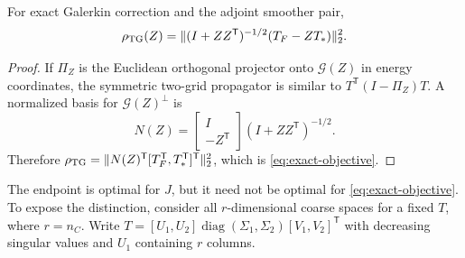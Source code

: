 \documentclass[smallextended]{svjour3}
\newcommand{\T}{\mathsf{T}}
\newcommand{\diag}{\operatorname{diag}}
\newcommand{\cG}{\mathcal{G}}
\newcommand{\norm}[1]{\lVert#1\rVert}
\begin{document}
\begin{theorem}\label{thm:exact-objective}
For exact Galerkin correction and the adjoint smoother pair,
\begin{equation}\label{eq:exact-objective}
 \rho_{\rm TG}(Z)
 =\norm{(I+ZZ^\T)^{-1/2}(T_F-ZT_*)}_2^2.
\end{equation}
\end{theorem}
\begin{proof}
If $\Pi_Z$ is the Euclidean orthogonal projector onto $\cG(Z)$ in energy coordinates, the symmetric two-grid propagator is similar to
$T^\T(I-\Pi_Z)T$. A normalized basis for $\cG(Z)^\perp$ is
\begin{equation*}
 N(Z)=\begin{bmatrix}I\\-Z^\T\end{bmatrix}(I+ZZ^\T)^{-1/2}.
\end{equation*}
Therefore
$\rho_{\rm TG}=\norm{N(Z)^\T[T_F^\T,T_*^\T]^\T}_2^2$, which is \eqref{eq:exact-objective}.
\end{proof}

The endpoint is optimal for $J$, but it need not be optimal for \eqref{eq:exact-objective}. To expose the distinction, consider all $r$-dimensional coarse spaces for a fixed $T$, where $r=n_C$. Write
$T=[U_1,U_2]\diag(\Sigma_1,\Sigma_2)[V_1,V_2]^\T$ with decreasing singular values and $U_1$ containing $r$ columns.
\end{document}
